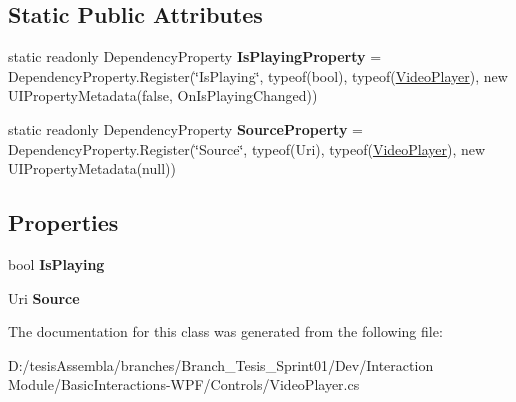 \subsection*{Static Public Attributes}
\begin{DoxyCompactItemize}
\item 
\hypertarget{class_microsoft_1_1_samples_1_1_kinect_1_1_basic_interactions_1_1_video_player_a7c536cc87e90bd249e98df49689f250f}{static readonly Dependency\-Property {\bfseries Is\-Playing\-Property} = Dependency\-Property.\-Register(\char`\"{}Is\-Playing\char`\"{}, typeof(bool), typeof(\hyperlink{class_microsoft_1_1_samples_1_1_kinect_1_1_basic_interactions_1_1_video_player}{Video\-Player}), new U\-I\-Property\-Metadata(false, On\-Is\-Playing\-Changed))}\label{class_microsoft_1_1_samples_1_1_kinect_1_1_basic_interactions_1_1_video_player_a7c536cc87e90bd249e98df49689f250f}

\item 
\hypertarget{class_microsoft_1_1_samples_1_1_kinect_1_1_basic_interactions_1_1_video_player_a10e6cf966ba8547f2676ad5537875e0c}{static readonly Dependency\-Property {\bfseries Source\-Property} = Dependency\-Property.\-Register(\char`\"{}Source\char`\"{}, typeof(Uri), typeof(\hyperlink{class_microsoft_1_1_samples_1_1_kinect_1_1_basic_interactions_1_1_video_player}{Video\-Player}), new U\-I\-Property\-Metadata(null))}\label{class_microsoft_1_1_samples_1_1_kinect_1_1_basic_interactions_1_1_video_player_a10e6cf966ba8547f2676ad5537875e0c}

\end{DoxyCompactItemize}
\subsection*{Properties}
\begin{DoxyCompactItemize}
\item 
\hypertarget{class_microsoft_1_1_samples_1_1_kinect_1_1_basic_interactions_1_1_video_player_a574411069f1942187c5b06c5e760d7af}{bool {\bfseries Is\-Playing}}\label{class_microsoft_1_1_samples_1_1_kinect_1_1_basic_interactions_1_1_video_player_a574411069f1942187c5b06c5e760d7af}

\item 
\hypertarget{class_microsoft_1_1_samples_1_1_kinect_1_1_basic_interactions_1_1_video_player_aa4b084ac7e0d8ea1f8547f00dfd47161}{Uri {\bfseries Source}}\label{class_microsoft_1_1_samples_1_1_kinect_1_1_basic_interactions_1_1_video_player_aa4b084ac7e0d8ea1f8547f00dfd47161}

\end{DoxyCompactItemize}


The documentation for this class was generated from the following file\-:\begin{DoxyCompactItemize}
\item 
D\-:/tesis\-Assembla/branches/\-Branch\-\_\-\-Tesis\-\_\-\-Sprint01/\-Dev/\-Interaction Module/\-Basic\-Interactions-\/\-W\-P\-F/\-Controls/Video\-Player.\-cs\end{DoxyCompactItemize}
